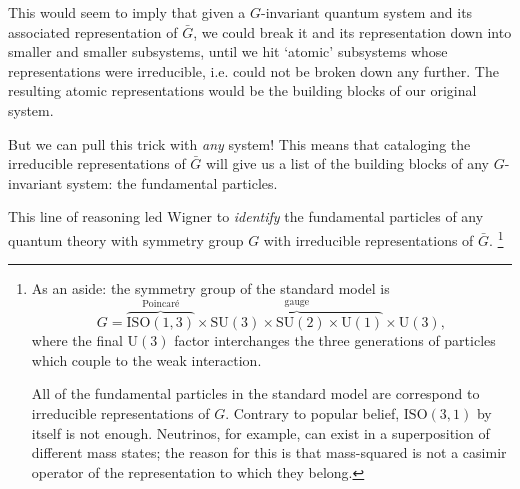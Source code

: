 \documentclass[a4paper]{report}
\theoremstyle{definition}
\theoremstyle{plain}
\theoremstyle{remark}
\begin{document}
This would seem to imply that given a $G$-invariant quantum system and its associated representation of $\bar{G}$, we could break it and its representation down into smaller and smaller subsystems, until we hit `atomic' subsystems whose representations were irreducible, i.e. could not be broken down any further. The resulting atomic representations would be the building blocks of our original system. 

But we can pull this trick with \emph{any} system! This means that cataloging the irreducible representations of $\bar{G}$ will give us a list of the building blocks of any $G$-invariant system: the fundamental particles.

This line of reasoning led Wigner to \emph{identify} the fundamental particles of any quantum theory with symmetry group $G$ with irreducible representations of $\bar{G}$. \footnote{As an aside: the symmetry group of the standard model is
\begin{equation*}
  G = \overbrace{\mathrm{ISO}(1, 3)}^{\text{Poincar\'{e}}} \times \overbrace{\mathrm{SU}(3) \times \mathrm{SU}(2) \times \mathrm{U}(1)}^{\text{gauge}} \times \mathrm{U}(3),
\end{equation*}
where the final $\mathrm{U}(3)$ factor interchanges the three generations of particles which couple to the weak interaction.

All of the fundamental particles in the standard model are correspond to irreducible representations of $G$. Contrary to popular belief, $\mathrm{ISO}(3, 1)$ by itself is not enough. Neutrinos, for example, can exist in a superposition of different mass states; the reason for this is that mass-squared is not a casimir operator of the representation to which they belong.\cite{neumaier}}
\end{document}
